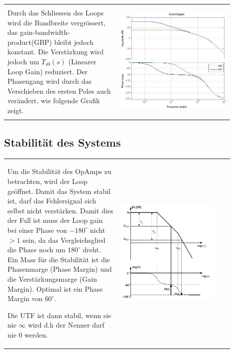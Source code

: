 \begin{tabular}{m{0.45\linewidth}m{0.45\linewidth}}
	Durch das Schliessen des Loops wird die Bandbreite vergrössert, das gain-bandwidth-product(GBP) bleibt jedoch konstant. Die Verstärkung wird jedoch um $T_{s0}(s)$ (Linearer Loop Gain) reduziert. Der Phasengang wird durch das Verschieben des ersten Poles auch verändert, wie folgende Grafik zeigt.
	& \begin{center}
        \includegraphics[width=6.7cm, valign=t]{./pictures/AolAcl.png}
    \end{center}
\end{tabular}
\vspace{-7mm}
\subsection{Stabilität des Systems}
\begin{tabular}{m{0.45\linewidth}m{0.45\linewidth}}
    Um die Stabilität des OpAmps zu betrachten, wird der Loop geöffnet. Damit das System stabil ist, darf das       
    Fehlersignal sich selbst nicht verstärken. Damit dies der Fall ist muss der Loop gain bei einer Phase von $-180^\circ$
    nicht $>1$ sein, da das Vergleichsglied die Phase noch um $180^\circ$ dreht. Ein Mass für die Stabilität ist die 
    Phasenmarge (Phase Margin) und die Verstärkungsmarge (Gain Margin). Optimal ist ein Phase Margin von $60^{\circ}$.
    
    Die UTF ist dann stabil, wenn sie nie $\infty$ wird d.h der Nenner darf nie 0 werden.
    & \begin{center}
        \includegraphics[width=5cm, valign=t]{./pictures/margins.png}
    \end{center}
\end{tabular}

